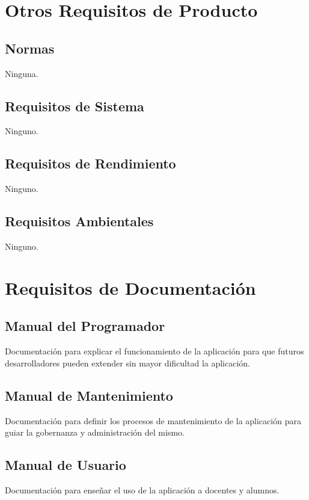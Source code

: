 \section{Otros Requisitos de Producto}
\subsection{Normas}
Ninguna.
\subsection{Requisitos de Sistema}
Ninguno.
\subsection{Requisitos de Rendimiento}
Ninguno.
\subsection{Requisitos Ambientales}
Ninguno.
\section{Requisitos de Documentación}
\subsection{Manual del Programador}
Documentación para explicar el funcionamiento de la aplicación para que futuros desarrolladores pueden extender sin mayor dificultad la aplicación.
\subsection{Manual de Mantenimiento}
Documentación para definir los procesos de mantenimiento de la aplicación para guiar la gobernanza y administración del mismo.
\subsection{Manual de Usuario}
Documentación para enseñar el uso de la aplicación a docentes y alumnos.

